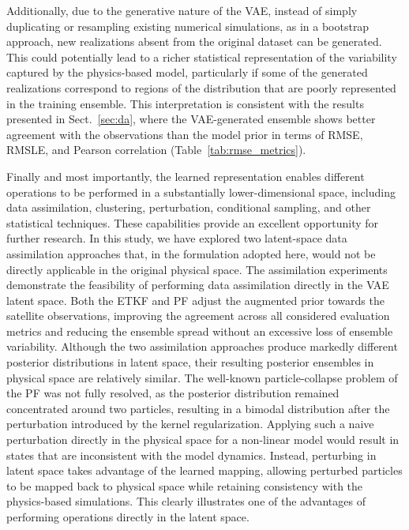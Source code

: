 %
%
Additionally, due to the generative nature of the VAE, instead of simply duplicating or resampling existing numerical simulations, as in a bootstrap approach, new realizations absent from the original dataset can be generated. This could potentially lead to a richer statistical representation of the variability captured by the physics-based model, particularly if some of the generated realizations correspond to regions of the distribution that are poorly represented in the training ensemble. This interpretation is consistent with the results presented in Sect.~\ref{sec:da}, where the VAE-generated ensemble shows better agreement with the observations than the model prior in terms of RMSE, RMSLE, and Pearson correlation (Table~\ref{tab:rmse_metrics}).

%
%
Finally and most importantly, the learned representation enables different operations to be performed in a substantially lower-dimensional space, including data assimilation, clustering, perturbation, conditional sampling, and other statistical techniques. These capabilities provide an excellent opportunity for further research. In this study, we have explored two latent-space data assimilation approaches that, in the formulation adopted here, would not be directly applicable in the original physical space.
%
%
The assimilation experiments demonstrate the feasibility of performing data assimilation directly in the VAE latent space. Both the ETKF and PF adjust the augmented prior towards the satellite observations, improving the agreement across all considered evaluation metrics and reducing the ensemble spread without an excessive loss of ensemble variability. Although the two assimilation approaches produce markedly different posterior distributions in latent space, their resulting posterior ensembles in physical space are relatively similar.
%
%
The well-known particle-collapse problem of the PF was not fully resolved, as the posterior distribution remained concentrated around two particles, resulting in a bimodal distribution after the perturbation introduced by the kernel regularization. Applying such a naive perturbation directly in the physical space for a non-linear model would result in states that are inconsistent with the model dynamics. Instead, perturbing in latent space takes advantage of the learned mapping, allowing perturbed particles to be mapped back to physical space while retaining consistency with the physics-based simulations. This clearly illustrates one of the advantages of performing operations directly in the latent space.

